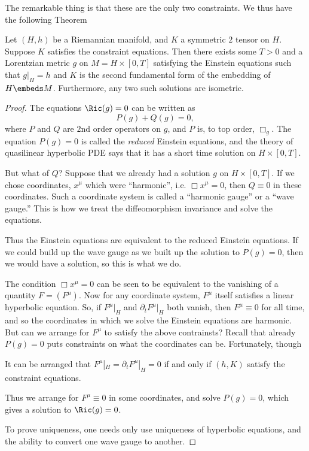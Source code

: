 \documentclass[12pt]{article}
\begin{document}
The remarkable thing is that these are the only two constraints. We thus have the following Theorem
\begin{thm}Let $(H,h)$ be a Riemannian manifold, and $K$ a symmetric $2$ tensor on $H$. Suppose $K$ satisfies the constraint equations. Then there exists some $T > 0$ and a Lorentzian metric $g$ on $M = H\times[0,T]$ satisfying the Einstein equations such that  $g|_H = h$ and $K$ is the second fundamental form of the embedding of $H \embeds M$. Furthermore, any two such solutions are isometric.\end{thm}
\begin{proof} The equations $\Ric(g) = 0$ can be written as
\[P(g) + Q(g) = 0,\] where $P$ and $Q$ are $2$nd order operators on $g$, and $P$ is, to top order, $\Box_g$. The equation $P(g) = 0$ is called the \emph{reduced} Einstein equations, and the theory of quasilinear hyperbolic PDE says that it has a short time solution on $H\times [0,T]$. 

But what of $Q$? Suppose that we already had a solution $g$ on  $H\times [0,T]$. If we chose coordinates, $x^\mu$ which were ``harmonic'', i.e. $\Box x^\mu = 0$, then $Q \equiv 0$ in these coordinates. Such a coordinate system is called a ``harmonic gauge'' or a ``wave gauge.'' This is how we treat the diffeomorphism invariance and solve the equations.

Thus the Einstein equations are equivalent to the reduced Einstein equations. If we could build up the wave gauge as we built up the solution to $P(g) = 0$, then we would have a solution, so this is what we do.

The condition $\Box x^\mu = 0$ can be seen to be equivalent to the vanishing of a quantity $F = (F^\mu)$. Now for any coordinate system, $F^\mu$ itself satisfies a linear hyperbolic equation. So, if $F^\mu|_H$ and $\partial_t F^\mu|_H$ both vanish, then $F^\mu \equiv 0$ for all time, and so the coordinates in which we solve the Einstein equations are harmonic. But can we arrange for $F^\mu$ to satisfy the above contrainsts? Recall that already $P(g) = 0$ puts constraints on what the coordinates can be. Fortunately, though
\begin{lem}It can be arranged that $F^\mu|_H = \partial_t F^\mu|_H = 0$ if and only if $(h,K)$ satisfy the constraint equations.\end{lem}
Thus we arrange for $F^\mu \equiv 0$ in some coordinates, and solve $P(g) = 0$, which gives a solution to $\Ric(g) = 0$.

To prove uniqueness, one needs only use uniqueness of hyperbolic equations, and the ability to convert one wave gauge to another.\end{proof}
\end{document}
